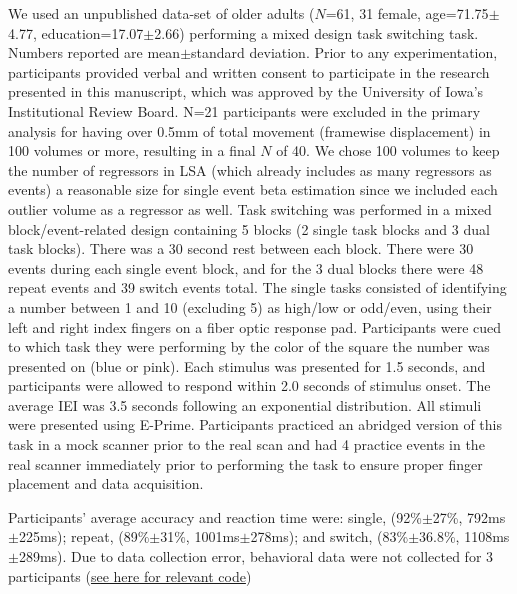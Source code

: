 \documentclass[phd,figures,tables,ackpage,abstractpage,publicabstractpage]{uithesis}
\begin{document}
We used an unpublished data-set
of older adults ($N$=61, 31 female,\newline
age=71.75$\pm$4.77, education=17.07$\pm$2.66)
performing a mixed design task switching task.
Numbers reported are mean$\pm$standard deviation.
Prior to any experimentation, participants provided verbal and written consent
to participate in the research presented in this manuscript, which was approved
by the University of Iowa's Institutional Review Board.
N=21 participants were excluded in the primary analysis for having over
0.5mm of total movement (framewise displacement) in 100 volumes or more,
resulting in a final $N$ of 40.
We chose 100 volumes to keep the number of regressors in LSA
(which already includes as many regressors as events) a reasonable size
for single event beta estimation since we included each outlier volume
as a regressor as well.
Task switching was performed in a mixed block/event-related design containing
5 blocks (2 single task blocks and 3 dual task blocks).
There was a 30 second rest between each block.
There were 30 events during each single event block,
and for the 3 dual blocks there were 48 repeat events and 39 switch events total.
The single tasks consisted of identifying a number between
1 and 10 (excluding 5) as high/low or odd/even, using their left and right index fingers
on a fiber optic response pad.
Participants were cued to which task they were performing by the color of the square
the number was presented on (blue or pink).
Each stimulus was presented for 1.5 seconds, and participants were allowed
to respond within 2.0 seconds of stimulus onset.
The average IEI was 3.5 seconds following an exponential distribution.
All stimuli were presented using E-Prime.
Participants practiced an abridged version of this task in a mock scanner
prior to the real scan and had 4 practice events in the real scanner immediately
prior to performing the task to ensure proper finger placement and data acquisition.

Participants' average accuracy and reaction time were:
single, (92\%$\pm$27\%, 792ms$\pm$225ms); repeat, (89\%$\pm$31\%, 1001ms$\pm$278ms);
and switch, (83\%$\pm$36.8\%,\newline
1108ms$\pm$289ms).
Due to data collection error, behavioral data were not collected for 3 participants
(\href{https://github.com/jdkent/BetaSeriesRealDataAnalysis/blob/b18b44321edf7b662a1e5ea635f64452c8d3644c/summarizeBehavior/summarize_behavior.ipynb}{see here for relevant code})
\end{document}
